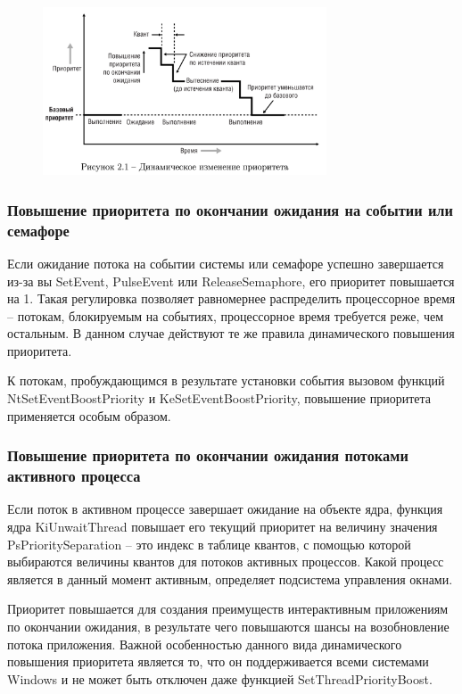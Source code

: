 \begin{figure}[h!]
	\centering
	\includegraphics[scale=1.0, width=0.75\textwidth]{assets/img-4}
\end{figure}

\subsubsection*{Повышение приоритета по окончании ожидания на событии или семафоре}

Если ожидание потока на событии системы или семафоре успешно завершается из-за вы SetEvent, PulseEvent или ReleaseSemaphore, его приоритет повышается на 1. Такая регулировка позволяет равномернее распределить процессорное время -- потокам, блокируемым на событиях, процессорное время требуется реже, чем остальным. В данном случае действуют те же правила динамического повышения приоритета. 

К потокам, пробуждающимся в результате установки события вызовом функций NtSetEventBoostPriority и KeSetEventBoostPriority, повышение приоритета применяется особым образом.

\subsubsection*{Повышение приоритета по окончании ожидания потоками активного процесса}

Если поток в активном процессе завершает ожидание на объекте ядра, функция ядра KiUnwaitThread повышает его текущий приоритет на величину значения PsPrioritySeparation -- это индекс в таблице квантов, с помощью которой выбираются величины квантов для потоков активных процессов. Какой процесс является в данный момент активным, определяет подсистема управления окнами.

Приоритет повышается для создания преимуществ интерактивным приложениям по окончании ожидания, в результате чего повышаются шансы на возобновление потока приложения. Важной особенностью данного вида динамического повышения приоритета является то, что он поддерживается всеми системами Windows и не может быть отключен даже функцией SetThreadPriorityBoost.

